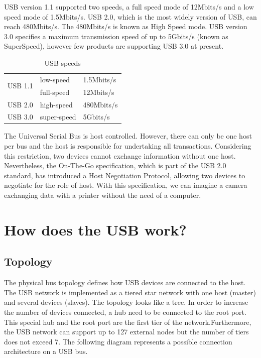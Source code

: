 \documentclass[pdftex,12pt,a4paper]{report}
\begin{document}
USB version 1.1 supported two speeds, a full speed mode of 12Mbits/s and a low speed mode of 1.5Mbits/s. USB 2.0, which is the most widely version of USB, can reach 480Mbits/s. The 480Mbits/s is known as High Speed mode. USB version 3.0 specifies a maximum transmission speed of up to 5Gbits/s (known as SuperSpeed), however few products are supporting USB 3.0 at present.
\\
\begin{table}[h!]
\begin{center}
\begin{tabular}{|l|l|l|}
\hline
\multirow{2}{*}{USB 1.1} & low-speed & 1.5Mbits/s \\
 & full-speed & 12Mbits/s \\ \hline
USB 2.0 & high-speed & 480Mbits/s \\ \hline
USB 3.0 & super-speed & 5Gbits/s \\ \hline
\end{tabular}
\end{center}
\caption{USB speeds}
\label{USB speeds}
\end{table}

The Universal Serial Bus is host controlled. However, there can only be one host per bus and the host is responsible for undertaking all transactions. Considering this restriction, two devices cannot exchange information without one host. Nevertheless, the On-The-Go specification, which is part of the USB 2.0 standard, has introduced a Host Negotiation Protocol, allowing two devices to negotiate for the role of host. With this specification, we can imagine a camera exchanging data with a printer without the need of a computer. 

\section{How does the USB work?}
\subsection{Topology}
The physical bus topology defines how USB devices are connected to the host. The USB network is implemented as a tiered star network with one host (master) and several devices (slaves). The topology looks like a tree. In order to increase the number of devices connected, a hub need to be connected to the root port. This special hub and the root port are the first tier of the network.Furthermore, the USB network can support up to 127 external nodes but the number of tiers does not exceed 7. The following diagram represents a possible connection architecture on a USB bus.
\end{document}
